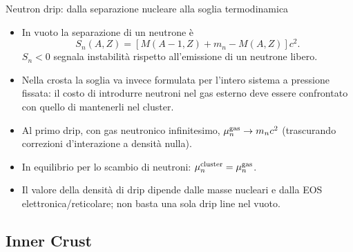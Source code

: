 \begin{frame}[t]{Neutron drip: dalla separazione nucleare alla soglia termodinamica}
\small
\begin{itemize}
\item In vuoto la separazione di un neutrone è
\[
S_n(A,Z)=[M(A-1,Z)+m_n-M(A,Z)]c^2.
\]
\(S_n<0\) segnala instabilità rispetto all'emissione di un neutrone libero.
\item Nella crosta la soglia va invece formulata per l'intero sistema a pressione fissata: il costo di introdurre neutroni nel gas esterno deve essere confrontato con quello di mantenerli nel cluster.
\item Al primo drip, con gas neutronico infinitesimo, \(\mu_n^{\rm gas}\to m_nc^2\) (trascurando correzioni d'interazione a densità nulla).
\item In equilibrio per lo scambio di neutroni: \(\mu_n^{\rm cluster}=\mu_n^{\rm gas}\).
\item Il valore della densità di drip dipende dalle masse nucleari e dalla EOS elettronica/reticolare; non basta una sola drip line nel vuoto.
\end{itemize}
\end{frame}

\subsection{Inner Crust}

